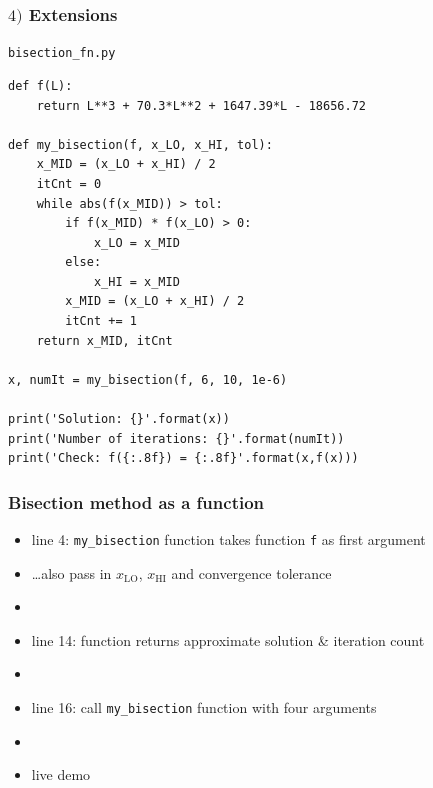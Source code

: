\documentclass[english,14pt]{beamer}
\begin{document}

\begin{frame}[fragile]

\frametitle{$4)$ Extensions}

\texttt{bisection\_fn.py}
\begin{lstlisting}[style=CStyle,basicstyle=\scriptsize]
def f(L):
    return L**3 + 70.3*L**2 + 1647.39*L - 18656.72

def my_bisection(f, x_LO, x_HI, tol):
    x_MID = (x_LO + x_HI) / 2
    itCnt = 0
    while abs(f(x_MID)) > tol:
        if f(x_MID) * f(x_LO) > 0:
            x_LO = x_MID
        else:
            x_HI = x_MID
        x_MID = (x_LO + x_HI) / 2
        itCnt += 1
    return x_MID, itCnt

x, numIt = my_bisection(f, 6, 10, 1e-6)

print('Solution: {}'.format(x))
print('Number of iterations: {}'.format(numIt))
print('Check: f({:.8f}) = {:.8f}'.format(x,f(x)))
\end{lstlisting}

\end{frame}


\begin{frame}[fragile]

\frametitle{Bisection method as a function}

\begin{itemize}
	\item line 4: \texttt{my\_bisection} function takes function \texttt{f} as first argument
	\item[] \ldots also pass in $x_\mathrm{LO}$, $x_\mathrm{HI}$ and convergence tolerance
	\item[]
	\item line 14: function returns approximate solution \& iteration count
	\item[]
	\item line 16: call \texttt{my\_bisection} function with four arguments
	\item[]
	\item live demo
\end{itemize}

\end{frame}

\end{document}
